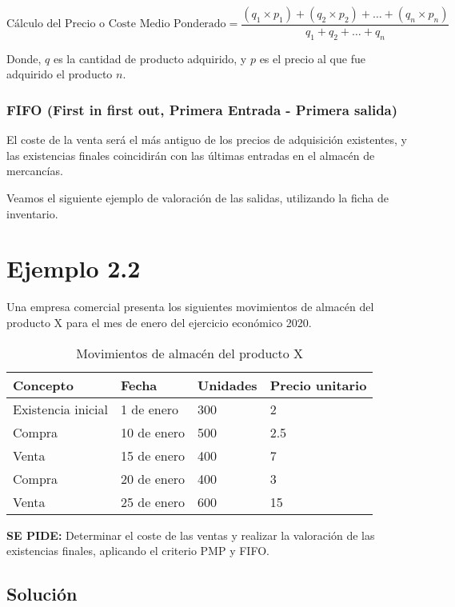 \documentclass{article}
\begin{document}
\begin{equation}
\text{Cálculo del Precio o Coste Medio Ponderado} = \frac{(q_1 \times p_1) + (q_2 \times p_2) + \ldots + (q_n \times p_n)}{q_1 + q_2 + \ldots + q_n}
\end{equation}

Donde, $q$ es la cantidad de producto adquirido, y $p$ es el precio al que fue adquirido el producto $n$.

\subsubsection{FIFO (First in first out, Primera Entrada - Primera salida)}
El coste de la venta será el más antiguo de los precios de adquisición existentes, y las existencias finales coincidirán con las últimas entradas en el almacén de mercancías.

Veamos el siguiente ejemplo de valoración de las salidas, utilizando la ficha de inventario.

\section*{Ejemplo 2.2}

Una empresa comercial presenta los siguientes movimientos de almacén del producto X para el mes de enero del ejercicio económico 2020.

\begin{table}[h]
\centering
\caption{Movimientos de almacén del producto X}
\begin{tabular}{llll}
\toprule
Concepto & Fecha & Unidades & Precio unitario \\
\midrule
Existencia inicial & 1 de enero & 300 & 2 \\
Compra & 10 de enero & 500 & 2.5 \\
Venta & 15 de enero & 400 &  7 \\
Compra & 20 de enero & 400 & 3 \\
Venta & 25 de enero & 600 & 15 \\
\bottomrule
\end{tabular}
\end{table}

\textbf{SE PIDE:} Determinar el coste de las ventas y realizar la valoración de las existencias finales, aplicando el criterio PMP y FIFO.

\subsection*{Solución}
\end{document}
